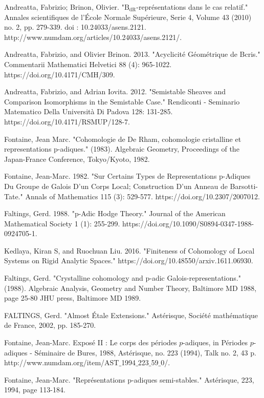 \documentclass[12pt]{book}
\theoremstyle{definition}
\begin{document}
\begin{thebibliography}{}
 Andreatta, Fabrizio; Brinon, Olivier. "$\mathrm {B}_{\mathrm {dR}}$-repr\'esentations dans le cas relatif." Annales scientifiques de l'\'Ecole Normale Sup\'erieure, Serie 4, Volume 43 (2010) no. 2, pp. 279-339. doi : 10.24033/asens.2121. http://www.numdam.org/articles/10.24033/asens.2121/.

 Andreatta, Fabrizio, and Olivier Brinon. 2013. "Acyclicit\'e G\'eom\'etrique de Bcris." Commentarii Mathematici Helvetici 88 (4): 965-1022. https://doi.org/10.4171/CMH/309.

 Andreatta, Fabrizio, and Adrian Iovita. 2012. "Semistable Sheaves and Comparison Isomorphisms in the Semistable Case." Rendiconti - Seminario Matematico Della Universit\`a Di Padova 128: 131-285. https://doi.org/10.4171/RSMUP/128-7.

 Fontaine, Jean Marc. "Cohomologie de De Rham, cohomologie cristalline et representations p-adiques." (1983). Algebraic Geometry, Proceedings of the Japan-France Conference, Tokyo/Kyoto, 1982.

 Fontaine, Jean-Marc. 1982. "Sur Certains Types de Representations p-Adiques Du Groupe de Galois D'un Corps Local; Construction D'un Anneau de Barsotti-Tate." Annals of Mathematics 115 (3): 529-577. https://doi.org/10.2307/2007012.

 Faltings, Gerd. 1988. "p-Adic Hodge Theory." Journal of the American Mathematical Society 1 (1): 255-299. https://doi.org/10.1090/S0894-0347-1988-0924705-1.

 Kedlaya, Kiran S, and Ruochuan Liu. 2016. "Finiteness of Cohomology of Local Systems on Rigid Analytic Spaces." https://doi.org/10.48550/arxiv.1611.06930.

 Faltings, Gerd. "Crystalline cohomology and p-adic Galois-representations." (1988). Algebraic Analysis, Geometry and Number Theory, Baltimore MD 1988, page 25-80 JHU press, Baltimore MD 1989.

 FALTINGS, Gerd. "Almost \'Etale Extensions." Ast\'erisque, Soci\'et\'e math\'ematique de France, 2002, pp. 185-270.

 Fontaine, Jean-Marc. Expos\'e II : Le corps des p\'eriodes $p$-adiques, in P\'eriodes $p$-adiques - S\'eminaire de Bures, 1988, Astérisque, no. 223 (1994), Talk no. 2, 43 p. http://www.numdam.org/item/AST$\_$1994$\_$223$\_$59$\_$0/.

 Fontaine, Jean-Marc. "Repr\'esentations p-adiques semi-stables." Ast\'erisque, 223, 1994, page 113-184.


\end{thebibliography}
\end{document}
